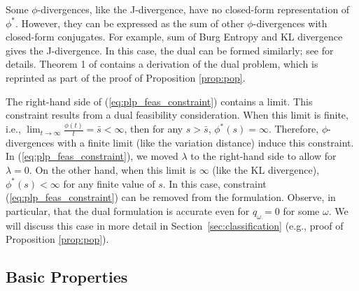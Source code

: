 \documentclass[opre,nonblindrev]{informs3} %
\begin{document}
Some $\phi$-divergences, like the J-divergence, have no closed-form representation of $\phi^*$. 
However, they can be expressed as the sum of other $\phi$-divergences with closed-form conjugates. 
For example, sum of Burg Entropy and KL divergence gives the J-divergence. 
In this case, the dual can be formed similarly; see \cite{bental2011robust} for details.
Theorem 1 of \cite{bental2011robust} contains a derivation of the dual problem, which is reprinted as part of the proof of Proposition \ref{prop:pop}.


The right-hand side of (\ref{eq:plp_feas_constraint}) contains a limit.
This constraint results from a dual feasibility consideration. 
When this limit is finite, i.e., $\lim_{t \rightarrow \infty} \frac{\phi(t)}{t}=  \bar{s}<\infty$, then for any $s> \bar{s}$, $\phi^*(s)=\infty$. 
Therefore, $\phi$-divergences with a finite limit (like the variation distance) induce this constraint.
In (\ref{eq:plp_feas_constraint}), we moved $\lambda$ to the right-hand side to allow for $\lambda=0$. 
On the other hand, when this limit is $\infty$ (like the KL divergence), $\phi^*(s)<\infty$ for any finite value of $s$. 
In this case, 
constraint (\ref{eq:plp_feas_constraint}) can be removed from the formulation. 
Observe, in particular, that the dual formulation is accurate even for $q_\omega = 0$ for some $\omega$.  
We will discuss this case in more detail in Section~\ref{sec:classification} (e.g., proof of  Proposition \ref{prop:pop}).



\subsection{Basic Properties}
\label{ssec:basicprop}
\end{document}
